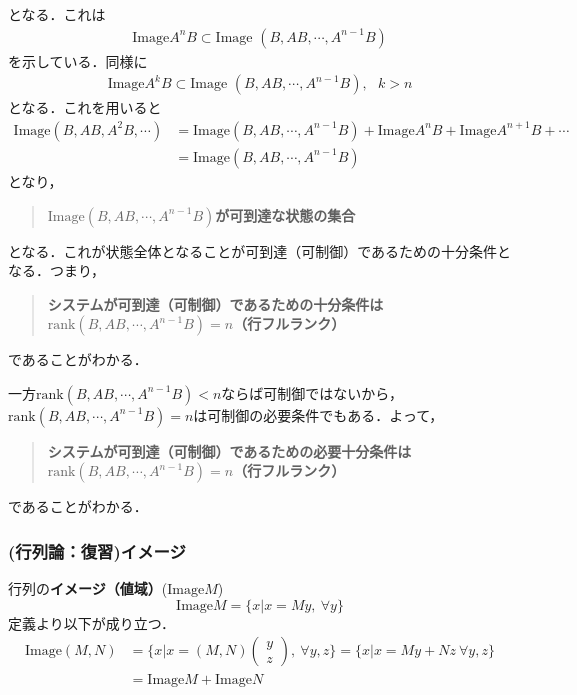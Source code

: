 となる．これは
\begin{align}
	\mbox{Image} A^{n} B \subset \mbox{Image }(B, A B, \cdots, A^{n-1} B )
\end{align}
を示している．同様に
\begin{align}
	\mbox{Image} A^{k} B \subset \mbox{Image }(B, A B, \cdots, A^{n-1} B )
	, \ \ \ k>n
\end{align}
となる．これを用いると
\begin{align}
	\mbox{Image} (B, AB, A^2B, \cdots) 
	&= \mbox{Image}(B, A B, \cdots, A^{n-1} B ) 
	       + \mbox{Image} A^n B + \mbox{Image} A^{n+1} B + \cdots
\nonumber \\
	&= \mbox{Image}(B, A B, \cdots, A^{n-1} B ) 
\end{align}
となり，
\begin{quote}
{\bf $\mbox{Image}(B, A B, \cdots, A^{n-1} B ) $が可到達な状態の集合}
\end{quote}
となる．これが状態全体となることが可到達（可制御）であるための十分条件となる．つまり，
\begin{quote}
{\bf システムが可到達（可制御）であるための十分条件は\\
$\mbox{rank}(B, A B, \cdots, A^{n-1} B )=n$（行フルランク）}
\end{quote}
であることがわかる．

一方$\mbox{rank}(B, A B, \cdots, A^{n-1} B )<n$ならば可制御ではないから，$\mbox{rank}(B, A B, \cdots, A^{n-1} B )=n$は可制御の必要条件でもある．よって，
\begin{quote}
{\bf システムが可到達（可制御）であるための必要十分条件は\\
$\mbox{rank}(B, A B, \cdots, A^{n-1} B )=n$（行フルランク）}
\end{quote}
であることがわかる．

\subsubsection{(行列論：復習)イメージ}

行列の{\bf {イメージ（値域）}}($\mbox{Image} M$)
\begin{equation}
	\mbox{Image} M = \{x \vert x=My, \ \forall y\}
\end{equation}
定義より以下が成り立つ．
\begin{align}
	\mbox{Image} (M,N) 
	  &= \{x \vert x=(M,N) \left( \begin{array}{c} y \\z \end{array} \right), \ \forall y,z\}
	   = \{x \vert x= My + Nz \ \forall y,z\}
\nonumber \\
	  &= \mbox{Image}M + \mbox{Image}N
\end{align}




